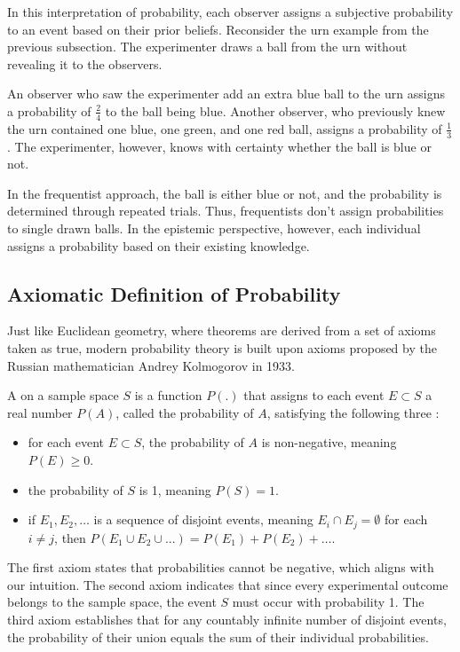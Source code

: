 In this interpretation of probability, each observer assigns a subjective probability to an event based on their prior beliefs.
Reconsider the urn example from the previous subsection.
The experimenter draws a ball from the urn without revealing it to the observers.

An observer who saw the experimenter add an extra blue ball to the urn assigns a probability of \( \frac{2}{4} \) to the ball being blue.
Another observer, who previously knew the urn contained one blue, one green, and one red ball, assigns a probability of \( \frac{1}{3} \).
The experimenter, however, knows with certainty whether the ball is blue or not.

In the frequentist approach, the ball is either blue or not, and the probability is determined through repeated trials.
Thus, frequentists don't assign probabilities to single drawn balls.
In the epistemic perspective, however, each individual assigns a probability based on their existing knowledge.

\subsection{Axiomatic Definition of Probability}

Just like Euclidean geometry, where theorems are derived from a set of axioms taken as true,
modern probability theory is built upon axioms proposed by the Russian mathematician Andrey Kolmogorov in 1933.

A  on a sample space \( S \) is a function \( P(.) \) that assigns
to each event \( E \subset S \) a real number \( P(A) \), called the probability of \( A \),
satisfying the following three :
\begin{itemize}
	\item for each event \( E \subset S \), the probability of \( A \) is non-negative, meaning \( P(E) \geq 0 \).
	\item the probability of \( S \) is 1, meaning \( P(S) = 1 \).
	\item if \( E_1, E_2, \ldots \) is a sequence of disjoint events, meaning \( E_i \cap E_j = \emptyset \) for each \( i \neq j \), then \( P(E_1 \cup E_2 \cup ...) = P(E_1) + P(E_2) + \ldots \).
\end{itemize}
The first axiom states that probabilities cannot be negative, which aligns with our intuition.
The second axiom indicates that since every experimental outcome belongs to the sample space, the event 
\( S \) must occur with probability 1.
The third axiom establishes that for any countably infinite number of disjoint events, the probability of their union equals the sum of their individual probabilities.

